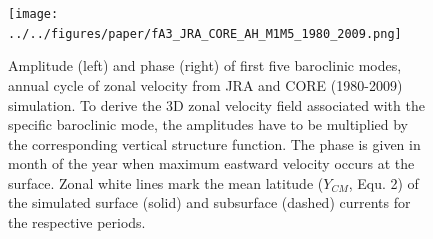 \documentclass[os, manuscript]{copernicus}
\begin{document}
\clearpage
\begin{figure}[t]
	\texttt{[image: ../../figures/paper/fA3\_JRA\_CORE\_AH\_M1M5\_1980\_2009.png]}
	\caption{Amplitude (left) and phase (right) of first five baroclinic modes, annual cycle of zonal velocity from JRA and CORE (1980-2009) simulation. To derive the 3D zonal velocity field associated with the specific baroclinic mode, the amplitudes have to be multiplied by the corresponding vertical structure function. The phase is given in month of the year when maximum eastward velocity occurs at the surface. Zonal white lines mark the mean latitude ($ Y_{CM} $, Equ. 2) of the simulated surface (solid) and subsurface (dashed) currents for the respective periods.}
	\label{fig_M1M5_AH_1980_2009}
\end{figure}    %
\end{document}
